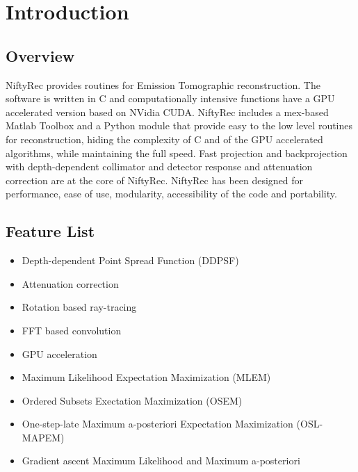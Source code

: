 \documentclass[12pt,a4paper]{report}
\begin{document}

\tableofcontents


\chapter{Introduction}

\section{Overview}

NiftyRec provides routines for Emission Tomographic reconstruction. 
The software is written in C and computationally intensive functions have a 
GPU accelerated version based on NVidia CUDA.
NiftyRec includes a mex-based Matlab Toolbox and a Python module that 
provide easy to the low level routines for reconstruction, hiding the complexity of C and 
of the GPU accelerated algorithms, while maintaining the full speed. 
Fast projection and backprojection with depth-dependent collimator and detector response and 
attenuation correction are at the core of NiftyRec. 
NiftyRec has been designed for performance, ease of use, modularity, accessibility of the code and portability.


\section{Feature List}

\begin{itemize}
  \item Depth-dependent Point Spread Function (DDPSF)
  \item Attenuation correction
  \item Rotation based ray-tracing
  \item FFT based convolution
  \item GPU acceleration
\end{itemize}

\begin{itemize}
  \item Maximum Likelihood Expectation Maximization (MLEM)
  \item Ordered Subsets Exectation Maximization (OSEM)
  \item One-step-late Maximum a-posteriori Expectation Maximization (OSL-MAPEM)
  \item Gradient ascent Maximum Likelihood and Maximum a-posteriori
\end{itemize}
\end{document}
